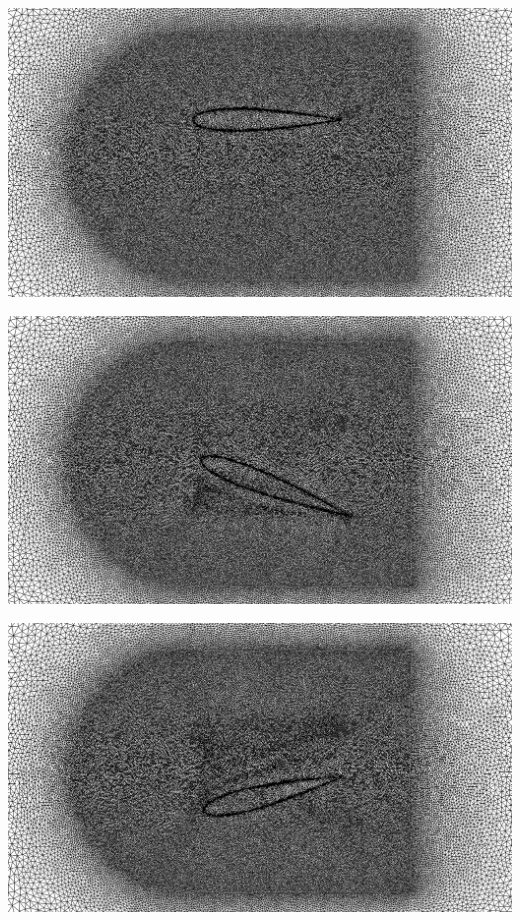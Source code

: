 \begingroup
	\begin{minipage}[t]{.5\linewidth}
		\centering
		 \includegraphics[scale=.15]{Bordeaux/figures/LSAdvection/NacaAdvNew0.png}
	\end{minipage}
	\begin{minipage}[t]{.5\linewidth}
		\centering
		 \includegraphics[scale=.15]{Bordeaux/figures/LSAdvection/NacaAdvNew10.png}
	\end{minipage}
	\begin{minipage}[t]{1.\linewidth}
		\centering
		 \includegraphics[scale=.15]{Bordeaux/figures/LSAdvection/NacaAdvNew20.png}
	\end{minipage}
\endgroup



